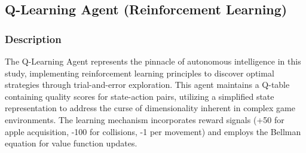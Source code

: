 \documentclass[11pt,a4paper]{article}
\begin{document}
\subsection{Q-Learning Agent (Reinforcement Learning)}

\subsubsection{Description}
The Q-Learning Agent represents the pinnacle of autonomous intelligence in this study, implementing reinforcement learning principles to discover optimal strategies through trial-and-error exploration. This agent maintains a Q-table containing quality scores for state-action pairs, utilizing a simplified state representation to address the curse of dimensionality inherent in complex game environments. The learning mechanism incorporates reward signals (+50 for apple acquisition, -100 for collisions, -1 per movement) and employs the Bellman equation for value function updates.
\end{document}
